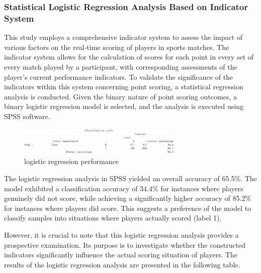 \documentclass{article}
\begin{document}
\subsubsection{Statistical Logistic Regression Analysis Based on Indicator System}
This study employs a comprehensive indicator system to assess the impact of various factors on the real-time scoring of players in sports matches.
The indicator system allows for the calculation of scores for each point in every set of every match played by a participant, with corresponding assessments
of the player's current performance indicators. To validate the significance of the indicators within this system concerning point scoring, a statistical regression analysis is conducted.
Given the binary nature of point scoring outcomes, a binary logistic regression model is selected, and the analysis is executed using SPSS software.
\begin{figure}[H]
      \centering
      \includegraphics[width=0.7\textwidth]{logistic_classfication_1.png}
      \caption{logistic regression performance}
\end{figure}
The logistic regression analysis in SPSS yielded an overall accuracy of 65.5\%. The model exhibited a classification accuracy of 34.4\%
for instances where players genuinely did not score, while achieving a significantly higher accuracy of 85.2\% for instances where players did score.
This suggests a preference of the model to classify samples into situations where players actually scored (label 1).

However, it is crucial to note that this logistic regression analysis provides a prospective examination. Its purpose is to investigate
whether the constructed indicators significantly influence the actual scoring situation of players. The results of the logistic regression analysis are presented in the following table.
\end{document}
